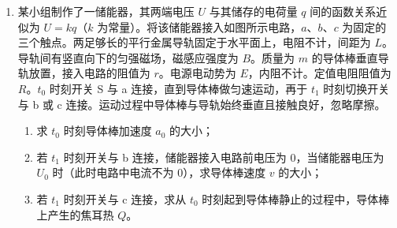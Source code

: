 \documentclass[\gkver]{gaokaozhenti}
\begin{document}
\begin{enumerate}
{解得 $\sin\theta = 0.9$
}
\item
某小组制作了一储能器，其两端电压 $U$ 与其储存的电荷量 $q$ 间的函数关系近似为 $U = kq$（$k$ 为常量）。将该储能器接入如图所示电路，$a$、$b$、$c$ 为固定的三个触点。两足够长的平行金属导轨固定于水平面上，电阻不计，间距为 $L$。导轨间有竖直向下的匀强磁场，磁感应强度为 $B$。质量为 $m$ 的导体棒垂直导轨放置，接入电路的阻值为 $r$。电源电动势为 $E$，内阻不计。定值电阻阻值为 $R$。$t_{0}$ 时刻开关 S 与 a 连接，直到导体棒做匀速运动，再于 $t_{1}$ 时刻切换开关与 b 或 c 连接。运动过程中导体棒与导轨始终垂直且接触良好，忽略摩擦。
\begin{enumerate}
	\item
	求 $t_{0}$ 时刻导体棒加速度 $a_{0}$ 的大小；
	\item
	若 $t_{1}$ 时刻开关与 b 连接，储能器接入电路前电压为 0，当储能器电压为 $U_{0}$ 时（此时电路中电流不为 0），求导体棒速度 $v$ 的大小；
	\item
	若 $t_{1}$ 时刻开关与 c 连接，求从 $t_{0}$ 时刻起到导体棒静止的过程中，导体棒上产生的焦耳热 $Q$。
\end{enumerate}
\onepicture[w=8.5cm, align=right]{}
\end{enumerate}
\end{document}
